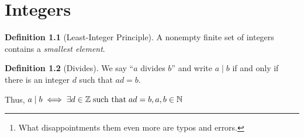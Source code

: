 \documentclass[english,notitlepage,smartquotes]{hgbreport}
\theoremstyle{definition}
\newtheorem*{definition}{Definition}
\theoremstyle{remark}
\theoremstyle{plain}
\begin{document}
\begin{abstract}
Readable and flawless mathematical typesetting is hard. It's ironic that the epitome of exact sciences breeds a degree of inexactness in notation. Like in literature, meaning sometimes depends on context not captured in notation. And yet, an encyclopedic treatment of notation at the beginning of a work like this tends to bore readers\footnote{What disappointments them even more are typos and errors.}. Here too, a balance needs to be sought. A few conventions are therefore in order:
\begin{itemize}
\item A roman letter in italics, like, for example, $p$, denotes an integer, unless specified otherwise.
\item The so-called \verb|\cdot|: $\cdot$ to denote multiplication is sometimes omitted. Thus, $ab$ is equivalent (and often even preferred and ubiquitous, thanks to Euler!) to $a\cdot b$.

\end{itemize}
\end{abstract}

\tableofcontents

\chapter{Integers}


\begin{definition}[Least-Integer Principle]
A nonempty finite set of integers contains a \emph{smallest element}.
\end{definition}
\begin{definition}[Divides]
\label{def:divides}
We say ``$a$ divides $b$'' and write $a\mid b$ if and only if there is an integer $d$ such that $ad=b$.

Thus, $a\mid b \iff \exists d\in \mathbb{Z} \text{\;such that\;} ad=b,  a, b\in \mathbb{N}$
\end{definition}
\end{document}
